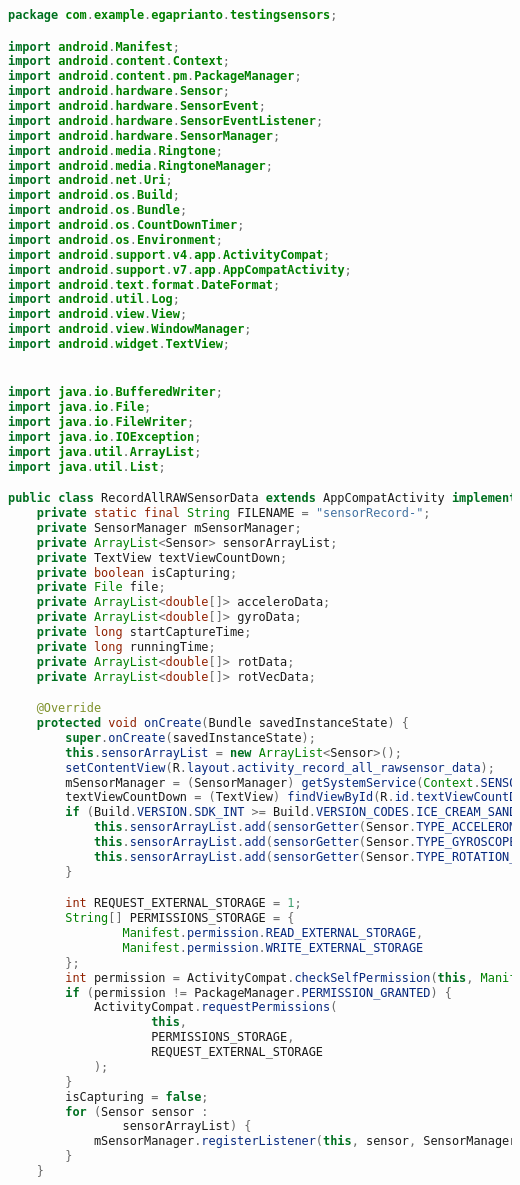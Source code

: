 \begin{lstlisting}[language=Java,basicstyle=\tiny,caption=RecordAllRAWSensorData.java]
package com.example.egaprianto.testingsensors;

import android.Manifest;
import android.content.Context;
import android.content.pm.PackageManager;
import android.hardware.Sensor;
import android.hardware.SensorEvent;
import android.hardware.SensorEventListener;
import android.hardware.SensorManager;
import android.media.Ringtone;
import android.media.RingtoneManager;
import android.net.Uri;
import android.os.Build;
import android.os.Bundle;
import android.os.CountDownTimer;
import android.os.Environment;
import android.support.v4.app.ActivityCompat;
import android.support.v7.app.AppCompatActivity;
import android.text.format.DateFormat;
import android.util.Log;
import android.view.View;
import android.view.WindowManager;
import android.widget.TextView;


import java.io.BufferedWriter;
import java.io.File;
import java.io.FileWriter;
import java.io.IOException;
import java.util.ArrayList;
import java.util.List;

public class RecordAllRAWSensorData extends AppCompatActivity implements SensorEventListener {
    private static final String FILENAME = "sensorRecord-";
    private SensorManager mSensorManager;
    private ArrayList<Sensor> sensorArrayList;
    private TextView textViewCountDown;
    private boolean isCapturing;
    private File file;
    private ArrayList<double[]> acceleroData;
    private ArrayList<double[]> gyroData;
    private long startCaptureTime;
    private long runningTime;
    private ArrayList<double[]> rotData;
    private ArrayList<double[]> rotVecData;

    @Override
    protected void onCreate(Bundle savedInstanceState) {
        super.onCreate(savedInstanceState);
        this.sensorArrayList = new ArrayList<Sensor>();
        setContentView(R.layout.activity_record_all_rawsensor_data);
        mSensorManager = (SensorManager) getSystemService(Context.SENSOR_SERVICE);
        textViewCountDown = (TextView) findViewById(R.id.textViewCountDown);
        if (Build.VERSION.SDK_INT >= Build.VERSION_CODES.ICE_CREAM_SANDWICH_MR1) {
            this.sensorArrayList.add(sensorGetter(Sensor.TYPE_ACCELEROMETER));
            this.sensorArrayList.add(sensorGetter(Sensor.TYPE_GYROSCOPE));
            this.sensorArrayList.add(sensorGetter(Sensor.TYPE_ROTATION_VECTOR));
        }

        int REQUEST_EXTERNAL_STORAGE = 1;
        String[] PERMISSIONS_STORAGE = {
                Manifest.permission.READ_EXTERNAL_STORAGE,
                Manifest.permission.WRITE_EXTERNAL_STORAGE
        };
        int permission = ActivityCompat.checkSelfPermission(this, Manifest.permission.WRITE_EXTERNAL_STORAGE);
        if (permission != PackageManager.PERMISSION_GRANTED) {
            ActivityCompat.requestPermissions(
                    this,
                    PERMISSIONS_STORAGE,
                    REQUEST_EXTERNAL_STORAGE
            );
        }
        isCapturing = false;
        for (Sensor sensor :
                sensorArrayList) {
            mSensorManager.registerListener(this, sensor, SensorManager.SENSOR_DELAY_GAME);
        }
    }


\end{lstlisting}
